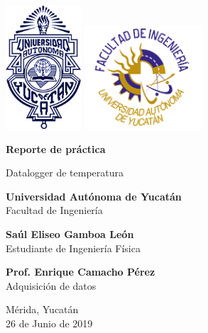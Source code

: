 \documentclass[11pt,twocolumn,letterpaper,spanish]{article}
\begin{document}
\begin{titlepage}

  \includegraphics[width=2.8cm]{Logos/uady.jpg}
  \hfill
  \includegraphics[width=4.4cm]{Logos/filogo.png}
  
  \hfill
   
    \begin{center}       
 
        \Huge
        \textbf{Reporte de práctica}
         
        \vspace{0.25cm}
        
        \LARGE
        Datalogger de temperatura
        \vspace{2.5cm}
        
        
		\LARGE \textbf{Universidad Autónoma de Yucatán\\}
        Facultad de Ingeniería\\        
        
        \vspace{1.5cm}
 
        \textbf{Saúl Eliseo Gamboa León}\\
        \vspace{0.2cm}
        Estudiante de Ingeniería Física
        
        \vspace{1.5cm}
        
        \textbf{Prof. Enrique Camacho Pérez}\\
        \vspace{0.2cm}
        Adquisición de datos
 
        \vspace{2cm}
 
        
 
        \LARGE
        Mérida, Yucatán\\
        26 de Junio de 2019
     
        
    \end{center}
\end{titlepage}
\end{document}
